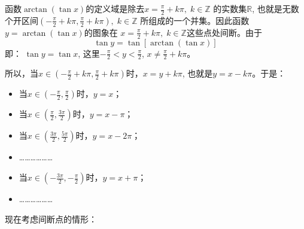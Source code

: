 \begin{solution}
函数$\arctan (\tan x)$的定义域是除去$x=\frac{\pi}{2}+k\pi,\; k\in\mathbb{Z}$
的实数集$\mathbb{R}$, 也就是无数个开区间$\left(-\frac{\pi}{2}+k\pi,\frac{\pi}{2}+k\pi\right),\; k\in\mathbb{Z}$
所组成的一个并集。因此函数$y=\arctan (\tan x)$的图象在
$x=\frac{\pi}{2}+k\pi,\; k\in\mathbb{Z}$这些点处间断。由于
\[\tan y=\tan[\arctan(\tan x)]\]
即：
$\tan y=\tan x$, 这里$-\frac{\pi}{2}<y<\frac{\pi}{2}$, $x\ne \frac{\pi}{2}+k\pi$。

所以，当$x\in\left(-\frac{\pi}{2}+k\pi,\frac{\pi}{2}+k\pi\right)$时，$x=y+k\pi$, 也就是$y=x-k\pi$。于是：
\begin{itemize}
    \item 当$x\in\left(-\frac{\pi}{2},\frac{\pi}{2}\right)$时，$y=x$；
    \item 当$x\in\left(\frac{\pi}{2},\frac{3\pi}{2}\right)$时，$y=x-\pi$；
    \item 当$x\in\left(\frac{3\pi}{2},\frac{5\pi}{2}\right)$时，$y=x-2\pi$；
    \item ………………
    \item 当$x\in\left(-\frac{3\pi}{2},-\frac{\pi}{2}\right)$时，$y=x+\pi$；
    \item ………………
\end{itemize}
现在考虑间断点的情形：

\end{solution}


\begin{example}
    
\end{example}

\begin{solution}
    
\end{solution}


\begin{example}
    
\end{example}

\begin{solution}
    
\end{solution}


\begin{example}
    
\end{example}

\begin{solution}
    
\end{solution}


